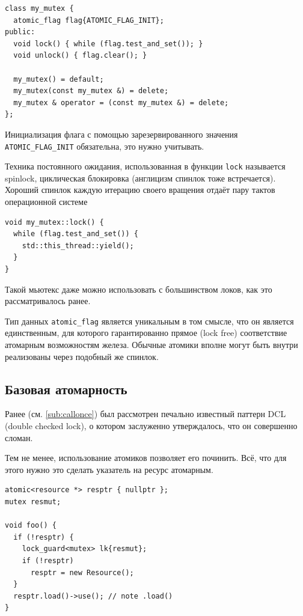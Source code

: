 \documentclass[a4paper,12pt,oneside]{book}
\begin{document}
\begin{lstlisting}
class my_mutex {
  atomic_flag flag{ATOMIC_FLAG_INIT};
public:
  void lock() { while (flag.test_and_set()); }
  void unlock() { flag.clear(); }

  my_mutex() = default;
  my_mutex(const my_mutex &) = delete;
  my_mutex & operator = (const my_mutex &) = delete;
};
\end{lstlisting}

Инициализация флага с помощью зарезервированного значения \lstinline!ATOMIC_FLAG_INIT! обязательна, это нужно учитывать.

Техника постоянного ожидания, использованная в функции \lstinline!lock! называется spinlock, циклическая блокировка (англицизм спинлок тоже встречается). Хороший спинлок каждую итерацию своего вращения отдаёт пару тактов операционной системе

\begin{lstlisting}
void my_mutex::lock() { 
  while (flag.test_and_set()) {
    std::this_thread::yield();
  }
}
\end{lstlisting}


Такой мьютекс даже можно использовать с большинством локов, как это рассматривалось ранее.

Тип данных \lstinline!atomic_flag! является уникальным в том смысле, что он является единственным, для которого гарантированно прямое (lock free) соответствие атомарным возможностям железа. Обычные атомики вполне могут быть внутри реализованы через подобный же спинлок.

\subsection{Базовая атомарность}\label{sub:atomics}

Ранее (см. \ref{sub:callonce}) был рассмотрен печально известный паттерн DCL (double checked lock), о котором заслуженно утверждалось, что он совершенно сломан.

Тем не менее, использование атомиков позволяет его починить. Всё, что для этого нужно это сделать указатель на ресурс атомарным.

\begin{lstlisting}
atomic<resource *> resptr { nullptr };
mutex resmut;

void foo() {
  if (!resptr) {
    lock_guard<mutex> lk{resmut};
    if (!resptr)
      resptr = new Resource();
  }
  resptr.load()->use(); // note .load()
}
\end{lstlisting}
\end{document}
